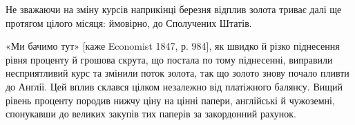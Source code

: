 \noindent{}Не зважаючи на зміну курсів наприкінці березня відплив золота триває
далі ще протягом цілого місяця: ймовірно, до Сполучених Штатів.

«Ми бачимо тут» [каже Economist 1847, р. 984], як швидко й різко піднесення
рівня проценту й грошова скрута, що постала по тому піднесенні, виправили
несприятливий курс та змінили поток золота, так що золото знову почало
пливти до Англії. Цей вплив склався цілком незалежно від платіжного балянсу.
Вищий рівень проценту породив нижчу ціну на цінні папери, англійські й
чужоземні, спонукавши до великих закупів тих паперів за закордонний рахунок.
\parbreak{}  %
